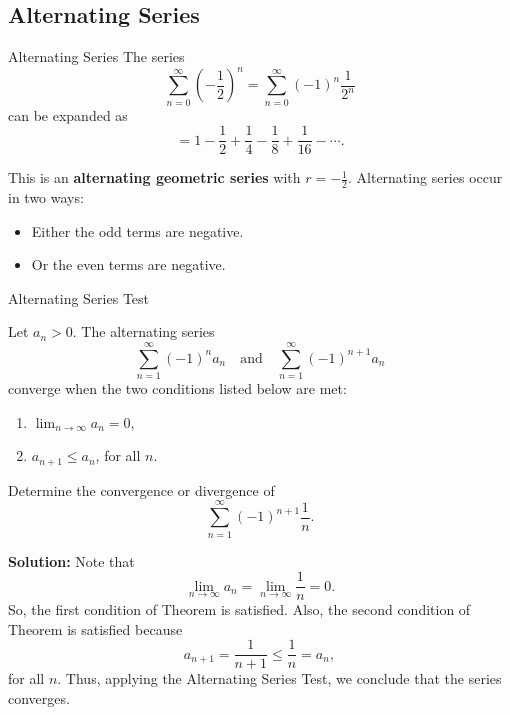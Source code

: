 \documentclass[12pt]{article}
\theoremstyle{beautifulthm}
\begin{document}
\newpage

\subsection{Alternating Series}

\begin{Definition}{Alternating Series}{}
The series
\[
\sum_{n=0}^\infty \left( -\frac{1}{2} \right)^n = \sum_{n=0}^\infty (-1)^n \frac{1}{2^n}
\]
can be expanded as
\[
= 1 - \frac{1}{2} + \frac{1}{4} - \frac{1}{8} + \frac{1}{16} - \cdots.
\]

This is an \textbf{alternating geometric series} with $r = -\frac{1}{2}$. Alternating series occur in two ways:
\begin{itemize}
    \item Either the odd terms are negative.
    \item Or the even terms are negative.
\end{itemize}

    
\end{Definition}

\begin{mytheorem}{ Alternating Series Test}{}

Let $a_n > 0$. The alternating series
\[
\sum_{n=1}^\infty (-1)^n a_n \quad \text{and} \quad \sum_{n=1}^\infty (-1)^{n+1} a_n
\]
converge when the two conditions listed below are met:
\begin{enumerate}
    \item $\lim_{n \to \infty} a_n = 0$,
    \item $a_{n+1} \leq a_n$, for all $n$.
\end{enumerate}
\end{mytheorem}
\begin{tcolorbox}[colback=examplebg, colframe=red!75!black, title=\textbf{EXAMPLE 1: Using the Alternating Series Test}, fonttitle=\bfseries, sharp corners]

Determine the convergence or divergence of
\[
\sum_{n=1}^\infty (-1)^{n+1} \frac{1}{n}.
\]

\tcblower
\textbf{Solution:} 
Note that
\[
\lim_{n \to \infty} a_n = \lim_{n \to \infty} \frac{1}{n} = 0.
\]
So, the first condition of Theorem is satisfied. Also, the second condition of Theorem is satisfied because
\[
a_{n+1} = \frac{1}{n+1} \leq \frac{1}{n} = a_n,
\]
for all $n$. Thus, applying the Alternating Series Test, we conclude that the series converges.
\end{tcolorbox}
\end{document}
